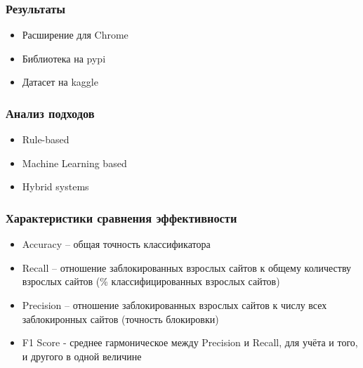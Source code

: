 \documentclass[xetex,mathserif,serif]{beamer}
\begin{document}
	\begin{frame}
		\frametitle{Результаты}
		\begin{itemize}
			\item Расширение для Chrome
			\item Библиотека на pypi
			\item Датасет на kaggle
		\end{itemize}
	\end{frame}
	
	\begin{frame}
		\frametitle{Анализ подходов}
		\begin{itemize}
			\item Rule-based
			\item Machine Learning based
			\item Hybrid systems
		\end{itemize}
	\end{frame}	
	
	\begin{frame}
		\frametitle{Характеристики сравнения эффективности}
		\begin{itemize}
			\item Accuracy – общая точность классификатора
			\item Recall – отношение заблокированных взрослых сайтов к общему количеству взрослых сайтов (\% классифицированных взрослых сайтов)
			\item Precision – отношение заблокированных взрослых сайтов к числу всех заблокиронных сайтов (точность блокировки)
			\item F1 Score - среднее гармоническое между Precision и Recall, для учёта и того, и другого в одной величине
		\end{itemize}
	\end{frame}
	
\end{document}
